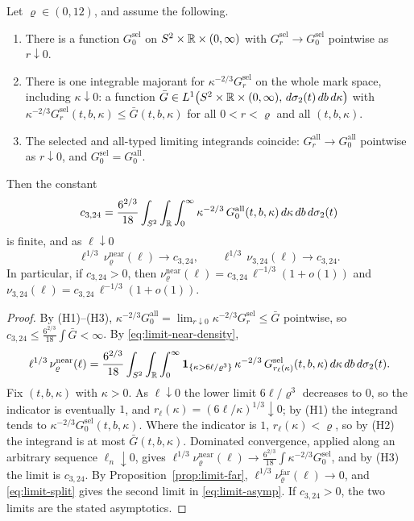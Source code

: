 \begin{theorem}\label{thm:limit-interchange}
Let $\varrho\in(0,12)$, and assume the following.
\begin{enumerate}[label=(H\arabic*)]
\item There is a function $G^{\mathrm{sel}}_0$ on $S^2\times\mathbb R\times(0,\infty)$ with $G^{\mathrm{sel}}_r\to G^{\mathrm{sel}}_0$ pointwise as $r\downarrow0$.
\item There is one integrable majorant for $\kappa^{-2/3}G^{\mathrm{sel}}_r$ on the whole mark space, including $\kappa\downarrow0$: a function $\bar G\in L^1\bigl(S^2\times\mathbb R\times(0,\infty),\,d\sigma_2(t)\,db\,d\kappa\bigr)$ with $\kappa^{-2/3}G^{\mathrm{sel}}_r(t,b,\kappa)\le\bar G(t,b,\kappa)$ for all $0<r<\varrho$ and all $(t,b,\kappa)$.
\item The selected and all-typed limiting integrands coincide: $G^{\mathrm{all}}_r\to G^{\mathrm{all}}_0$ pointwise as $r\downarrow0$, and $G^{\mathrm{sel}}_0=G^{\mathrm{all}}_0$.
\end{enumerate}
Then the constant
\begin{equation}\label{eq:limit-const}
c_{3,24}=\frac{6^{2/3}}{18}\int_{S^2}\int_{\mathbb R}\int_0^\infty\kappa^{-2/3}\,G^{\mathrm{all}}_0(t,b,\kappa)\,d\kappa\,db\,d\sigma_2(t)
\end{equation}
is finite, and as $\ell\downarrow0$
\begin{equation}\label{eq:limit-asymp}
\ell^{1/3}\,\nu^{\mathrm{near}}_\varrho(\ell)\to c_{3,24},\qquad \ell^{1/3}\,\nu_{3,24}(\ell)\to c_{3,24}.
\end{equation}
In particular, if $c_{3,24}>0$, then $\nu^{\mathrm{near}}_\varrho(\ell)=c_{3,24}\,\ell^{-1/3}(1+o(1))$ and $\nu_{3,24}(\ell)=c_{3,24}\,\ell^{-1/3}(1+o(1))$.
\end{theorem}

\begin{proof}
By (H1)--(H3), $\kappa^{-2/3}G^{\mathrm{all}}_0=\lim_{r\downarrow0}\kappa^{-2/3}G^{\mathrm{sel}}_r\le\bar G$ pointwise, so $c_{3,24}\le\frac{6^{2/3}}{18}\int\bar G<\infty$. By \eqref{eq:limit-near-density},
\[
\ell^{1/3}\,\nu^{\mathrm{near}}_\varrho(\ell)=\frac{6^{2/3}}{18}\int_{S^2}\int_{\mathbb R}\int_0^\infty\mathbf 1_{\{\kappa>6\ell/\varrho^3\}}\,\kappa^{-2/3}\,G^{\mathrm{sel}}_{r_\ell(\kappa)}(t,b,\kappa)\,d\kappa\,db\,d\sigma_2(t).
\]
Fix $(t,b,\kappa)$ with $\kappa>0$. As $\ell\downarrow0$ the lower limit $6\ell/\varrho^3$ decreases to $0$, so the indicator is eventually $1$, and $r_\ell(\kappa)=(6\ell/\kappa)^{1/3}\downarrow0$; by (H1) the integrand tends to $\kappa^{-2/3}G^{\mathrm{sel}}_0(t,b,\kappa)$. Where the indicator is $1$, $r_\ell(\kappa)<\varrho$, so by (H2) the integrand is at most $\bar G(t,b,\kappa)$. Dominated convergence, applied along an arbitrary sequence $\ell_n\downarrow0$, gives $\ell^{1/3}\nu^{\mathrm{near}}_\varrho(\ell)\to\frac{6^{2/3}}{18}\int\kappa^{-2/3}G^{\mathrm{sel}}_0$, and by (H3) the limit is $c_{3,24}$. By Proposition~\ref{prop:limit-far}, $\ell^{1/3}\nu^{\mathrm{far}}_\varrho(\ell)\to0$, and \eqref{eq:limit-split} gives the second limit in \eqref{eq:limit-asymp}. If $c_{3,24}>0$, the two limits are the stated asymptotics.
\end{proof}

